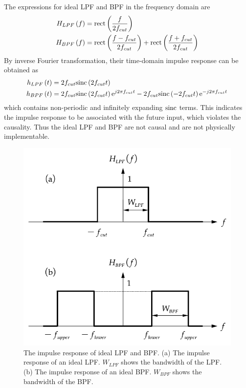 \documentclass[../ECE459FinalProjectReport.tex]{subfiles}
\begin{document}
The expressions for ideal LPF and BPF in the frequency domain are
\begin{align}
    H_{LPF}\left(f\right) &= \text{rect}\left( \frac{f}{2f_{cut}} \right) \\
    H_{BPF}\left(f\right) &= \text{rect}\left( \frac{f-f_{cut}}{2f_{cut}} \right) + \text{rect}\left( \frac{f+f_{cut}}{2f_{cut}} \right)
\end{align}
By inverse Fourier transformation, their time-domain impulse response can be obtained as
\begin{align}
    h_{LPF}\left(t\right) &= 2f_{cut}\text{sinc}\left(2f_{cut} t\right) \\
    h_{BPF}\left(t\right) &= 2f_{cut}\text{sinc}\left(2f_{cut} t\right)\mathrm{e}^{j2\pi f_{cut} t} - 2f_{cut}\text{sinc}\left(-2f_{cut} t\right)\mathrm{e}^{-j2\pi f_{cut} t}
\end{align}
which contains non-periodic and infinitely expanding $\text{sinc}$ terms. This indicates the impulse response to be associated with the future input, which violates the causality. Thus the ideal LPF and BPF are not causal and are not physically implementable.

\begin{figure}[b]
    \centering
    \includegraphics[scale=0.6]{plots/ideal-filters.pdf}
    \caption{The impulse response of ideal LPF and BPF. (a) The impulse response of an ideal LPF. $W_{LPF}$ shows the bandwidth of the LPF. (b) The impulse response of an ideal BPF. $W_{BPF}$ shows the bandwidth of the BPF.}
    \label{fig:ideal-filter}
\end{figure}
\end{document}
